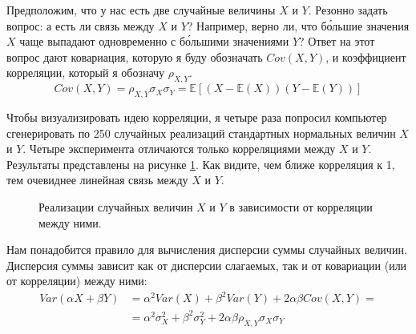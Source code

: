 Предположим, что у нас есть две случайные величины $X$ и $Y$. Резонно задать 
вопрос: а есть ли связь между $X$ и $Y$? Например, верно ли, что б\'{о}льшие 
значения $X$ чаще выпадают одновременно с б\'{о}льшими значениями $Y$? Ответ на 
этот вопрос дают ковариация, которую я буду обозначать $Cov(X,Y)$, и коэффициент 
корреляции, который я обозначу $\rho_{X,Y}$.
\begin{equation*}
Cov(X,Y) = \rho_{X,Y}\sigma_X\sigma_Y 
= \mathbb{E}\left[(X - \mathbb{E}(X))(Y - \mathbb{E}(Y)) \right]
\end{equation*}

Чтобы визуализировать идею корреляции, я четыре раза попросил компьютер 
сгенерировать по 250 случайных реализаций стандартных нормальных величин $X$ и 
$Y$. Четыре эксперимента отличаются только корреляциями между $X$ и $Y$. 
Результаты представлены на рисунке \ref{covariance_example}. Как видите, чем 
ближе корреляция к 1, тем очевиднее линейная связь между $X$ и $Y$.

\begin{figure}[h]
\centering
{}
\caption{Реализации случайных величин $X$ и $Y$ в зависимости от корреляции 
между ними.}
\label{covariance_example}
\end{figure}

Нам понадобится правило для вычисления дисперсии суммы случайных величин. 
Дисперсия суммы зависит как от дисперсии слагаемых, так и от ковариации (или от 
корреляции) между ними:
\begin{align}
Var(\alpha X + \beta Y)
&=
\alpha^2 Var(X) + \beta^2 Var(Y) + 2 \alpha \beta Cov(X, Y) = \nonumber \\
&=
\alpha^2\sigma_X^2 + \beta^2 \sigma_Y^2 
+ 2\alpha\beta\rho_{X,Y}\sigma_X\sigma_Y
\label{variance_of_linear_combination}
\end{align}

